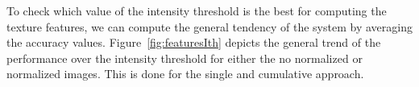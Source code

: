 To check which value of the intensity threshold is the best for computing the texture features, we can compute the general tendency of the system by averaging the accuracy values. Figure~\ref{fig:featuresIth} depicts the general trend of the performance over the intensity threshold for either the no normalized or normalized images. This is done for the single and cumulative approach. 

\begin{figure}%
	\centering
	\\
	\\

\end{figure}
